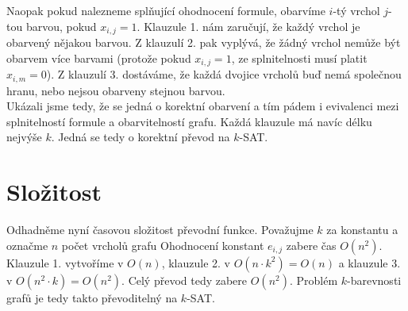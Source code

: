 \documentclass{scrartcl}
\begin{document}
Naopak pokud nalezneme splňující ohodnocení formule, obarvíme $i$-tý vrchol $j$-tou barvou, pokud $x_{i,j} = 1$. Klauzule 1. nám zaručují, že každý vrchol je obarvený nějakou barvou. Z klauzulí 2. pak vyplývá, že žádný vrchol nemůže být obarvem více barvami (protože pokud $x_{i,j} = 1$, ze splnitelnosti musí platit $x_{i,m} = 0$). Z klauzulí 3. dostáváme, že každá dvojice vrcholů buď nemá společnou hranu, nebo nejsou obarveny stejnou barvou.\\

Ukázali jsme tedy, že se jedná o korektní obarvení a tím pádem i evivalenci mezi splnitelností formule a obarvitelností grafu. Každá klauzule má navíc délku nejvýše $k$. Jedná se tedy o korektní převod na $k$-SAT.

\section{Složitost}
Odhadněme nyní časovou složitost převodní funkce. Považujme $k$ za konstantu a označme $n$ počet vrcholů grafu Ohodnocení konstant $e_{i,j}$ zabere čas $O(n^2)$. Klauzule 1. vytvoříme v $O(n)$, klauzule 2. v $O(n \cdot k^2) = O(n)$ a klauzule 3. v $O(n^2 \cdot k) = O(n^2)$. Celý převod tedy zabere $O(n^2)$. Problém $k$-barevnosti grafů je tedy takto převoditelný na $k$-SAT.
\end{document}
